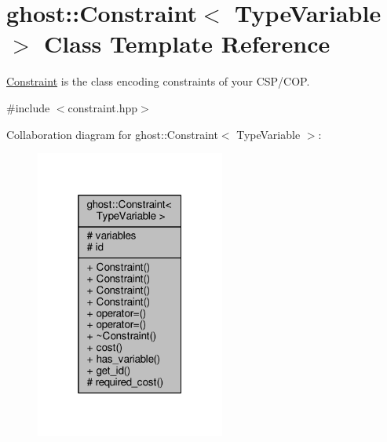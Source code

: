 \hypertarget{classghost_1_1Constraint}{\section{ghost\-:\-:Constraint$<$ Type\-Variable $>$ Class Template Reference}
\label{classghost_1_1Constraint}
}


\hyperlink{classghost_1_1Constraint}{Constraint} is the class encoding constraints of your C\-S\-P/\-C\-O\-P.  




{\ttfamily \#include $<$constraint.\-hpp$>$}



Collaboration diagram for ghost\-:\-:Constraint$<$ Type\-Variable $>$\-:\nopagebreak
\begin{figure}[H]
\begin{center}
\leavevmode
\includegraphics[width=176pt]{classghost_1_1Constraint__coll__graph}
\end{center}
\end{figure}
